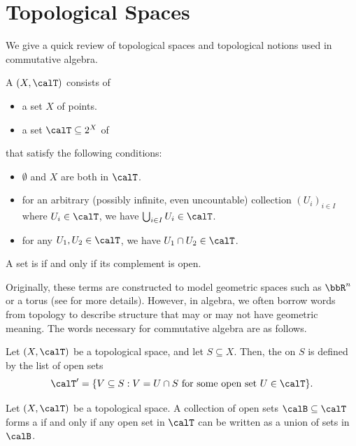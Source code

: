 \section{Topological Spaces}
\label{sec:topological_space}
We give a quick review of topological spaces
and topological notions used in commutative algebra.
\begin{definition}
A  $(X,\calT)$ consists of 
\begin{itemize}
    \item a set $X$ of points.
    \item a set $\calT\subseteq 2^X$ of 
\end{itemize}
that satisfy the following conditions:
\begin{itemize}
    \item $\emptyset$ and $X$ are both in $\calT$.
    \item for an arbitrary (possibly infinite, even uncountable) collection 
    $(U_i)_{i\in I}$ where $U_i\in\calT$,
     we have $\bigcup_{i\in I} U_i\in \calT$.
    \item for any $U_1,U_2\in\calT$, we have 
    $U_1\cap U_2\in\calT$.
\end{itemize}
A set is  if and only if its complement is open.
\end{definition}
Originally, these terms are constructed to model geometric 
spaces such as $\bbR^n$ or a torus (see \cite{topology} 
for more details). 
However, in algebra, we often borrow words from topology to describe structure that may or may not have geometric meaning.
The words necessary for commutative algebra are as follows.
\begin{definition}
    Let $(X,\calT)$ be a topological space,
    and let $S\subseteq X$.
    Then, the 
    on $S$ is defined by the list of open sets
    $$\calT' = \{V\subseteq S : V=U\cap S
    \text{ for some open set }U\in\calT\}.$$
\end{definition}
\begin{definition}[Bases]
    Let $(X,\calT)$ be a topological space.
    A collection of open sets $\calB\subseteq \calT$
    forms a  if and only if any open set 
    in $\calT$ can be written as a union of sets in $\calB$.
\end{definition}

